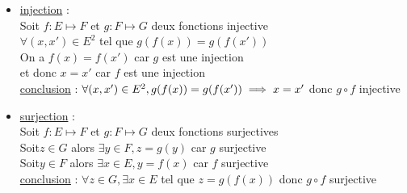 \begin{dem}[Composition]
    \begin{itemize}
        \item \underline{injection} :\\
        Soit \(f : E\mapsto F\) et \(g:F\mapsto G\) deux fonctions injective \\
        \(\forall (x,x')\in E^2 \) tel que \( g(f(x)) = g(f(x'))\) \\
        On a \(f(x) = f(x')\) car \(g\) est une injection \\
        et donc \(x=x'\) car \(f\) est une injection \\
        \underline{conclusion} : \(\forall (x,x')\in E^2, g(f(x)) = g(f(x')) \implies x=x'\) donc \(g\circ f\) injective\\

        \item\underline{surjection} : \\
        Soit \(f : E\mapsto F\) et \(g:F\mapsto G\) deux fonctions surjectives \\
        Soit\(z \in G\) alors \(\exists y \in F,z=g(y)\) car \(g\) surjective \\
        Soit\(y \in F\) alors \(\exists x \in E,y=f(x)\) car \(f\) surjective \\
        \underline{conclusion} : \(\forall z \in G,\exists x \in E \) tel que \(z = g(f(x))\) donc \(g\circ f\) surjective
    \end{itemize}
\end{dem}


